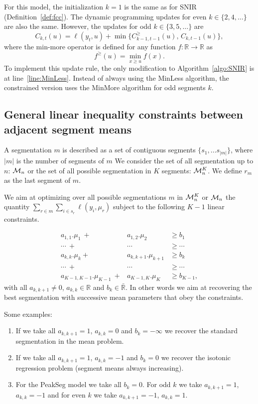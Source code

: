 \documentclass{article}
\newcommand{\RR}{\mathbb R}
\begin{document}
For this model, the initialization $k=1$ is the same as for SNIR
(Definition~\ref{def:fcc}). The dynamic programming updates for even
$k\in\{2, 4, \dots\}$ are also the same. However, the updates for odd
$k\in\{3, 5, \dots\}$ are
\begin{equation}
  C_{k,t}(u) = \ell(y_t, u) + \min\{
  C_{k-1,t-1}^\geq(u),\, C_{k,t-1}(u)
  \},
\end{equation}
where the min-more operator is defined for any function $f:\RR\rightarrow\RR$ as
\begin{equation}
  \label{eq:min-more-def}
  f^\geq(u) = \min_{x\geq u} f(x).
\end{equation}
To implement this update rule, the only modification to
Algorithm~\ref{algo:SNIR} is at line~\ref{line:MinLess}. Instead of
always using the MinLess algorithm, the constrained version uses the
MinMore algorithm for odd segments $k$.

\subsection{General linear inequality constraints
  between adjacent segment means}

A segmentation $m$ is described as a set of contiguous segments $\{s_1, ... s_{|m|} \}$, where $|m|$ is the number of segments of $m$
We consider the set of all segmentation up to $n$: $\mathcal{M}_n$ 
or the set of all possible segmentation in $K$ segments: $\mathcal{M}^K_n$.
We define $r_m$ as the last segment of $m$.

We aim at optimizing over all possible segmentations $m$ in $\mathcal{M}^K_n$ or $\mathcal{M}_n$
 the quantity
$\sum_{r \in m} \sum_{i \in s_{r}} \ell(y_i, \mu_{r})$ subject to
the following $K-1$ linear constraints. 

\begin{eqnarray*}
a_{1,1}.\mu_1 \ + & a_{1,2}.\mu_2  & \geq  b_1 \\
\cdots \ +&  \cdots & \geq \cdots \\
a_{k,k}.\mu_{k} + & a_{k,k+1}.\mu_{k+1}  & \geq  b_{k} \\
\cdots \ +&  \cdots & \geq \cdots  \\
a_{K-1,K-1}.\mu_{K-1} \ +& a_{K-1,K}.\mu_K & \geq  b_{K-1},
\end{eqnarray*}
with all $a_{k,k+1} \neq 0$, $a_{k,k} \in \mathbb{R}$ and
$b_{k} \in \bar{\mathbb{R}}.$ In other words we aim at recovering the
best segmentation with successive mean parameters that obey the
constraints.

Some examples:
\begin{enumerate}
\item If we take all $a_{k,k+1} =1$, $a_{k,k}=0$ and $b_{k} = - \infty$ we recover the standard segmentation in the mean problem.
\item If we take all $a_{k,k+1} =1$, $a_{k,k}=-1$ and $b_{k} = 0$ we
  recover the isotonic regression problem (segment means always
  increasing).
\item For the PeakSeg model we take all $b_{k} = 0$. For odd $k$ we
  take $a_{k,k+1} =1$, $a_{k,k}=-1$ and for even $k$ we take
  $a_{k,k+1} =-1$, $a_{k,k}=1$.
\end{enumerate}
\end{document}
